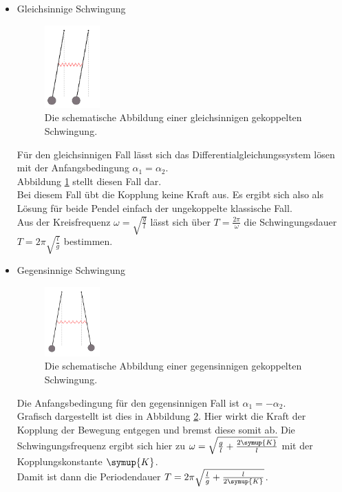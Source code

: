 \newpage
\begin{itemize}
    \item {\Large Gleichsinnige Schwingung\\}{
        \begin{figure}[H]
            \centering
            \includegraphics[width=0.2\textwidth]{latex/images/schwing1.PNG}
            \caption{Die schematische Abbildung einer gleichsinnigen gekoppelten Schwingung\protect \cite{V106}.}
            \label{img:1}
        \end{figure}
        \noindent
        Für den gleichsinnigen Fall lässt sich das Differentialgleichungssystem lösen mit der Anfangsbedingung $\alpha_1 = \alpha_2$.\\
        Abbildung \ref{img:1} stellt diesen Fall dar.\\
        Bei diesem Fall übt die Kopplung keine Kraft aus. 
        Es ergibt sich also als Lösung für beide Pendel einfach der ungekoppelte klassische Fall.\\
        Aus der Kreisfrequenz $\omega=\sqrt{\frac{g}{l}}$ lässt sich über $T=\frac{2 \pi}{\omega}$ die Schwingungsdauer $T=2 \pi \sqrt{\frac{l}{g}}$ bestimmen.\\
    }
    \item {\Large Gegensinnige Schwingung\\}{
        \begin{figure}[H]
            \centering
            \includegraphics[width=0.2\textwidth]{latex/images/schwing2.PNG}
            \caption{Die schematische Abbildung einer gegensinnigen gekoppelten Schwingung\protect \cite{V106}.}
            \label{img:2}
        \end{figure}
        \noindent Die Anfangsbedingung für den gegensinnigen Fall ist $\alpha_1 = -\alpha_2$.\\
        Grafisch dargestellt ist dies in Abbildung \ref{img:2}.
        Hier wirkt die Kraft der Kopplung der Bewegung entgegen und bremst diese somit ab.
        Die Schwingungsfrequenz ergibt sich hier zu $\omega=\sqrt{\frac{g}{l}+\frac{2 \symup{K}}{l}}$ mit der Kopplungskonstante $\symup{K}$.\\
        Damit ist dann die Periodendauer $T=2 \pi \sqrt{\frac{l}{g}+\frac{l}{2 \symup{K}}} $.\\
        }


\end{itemize}
